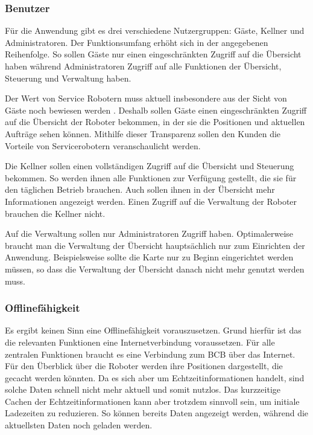 \subsubsection{Benutzer}

Für die Anwendung gibt es drei verschiedene Nutzergruppen: Gäste, Kellner und Administratoren. Der Funktionsumfang erhöht sich in der angegebenen Reihenfolge. So sollen Gäste nur einen eingeschränkten Zugriff auf die Übersicht haben während Administratoren Zugriff auf alle Funktionen der Übersicht, Steuerung und Verwaltung haben.

Der Wert von Service Robotern muss aktuell insbesondere aus der Sicht von Gäste noch bewiesen werden \cite[S.~429]{Paluch2020}. Deshalb sollen Gäste einen eingeschränkten Zugriff auf die Übersicht der Roboter bekommen, in der sie die Positionen und aktuellen Aufträge sehen können. Mithilfe dieser Transparenz sollen den Kunden die Vorteile von Servicerobotern veranschaulicht werden.

Die Kellner sollen einen vollständigen Zugriff auf die Übersicht und Steuerung bekommen. So werden ihnen alle Funktionen zur Verfügung gestellt, die sie für den täglichen Betrieb brauchen. Auch sollen ihnen in der Übersicht mehr Informationen angezeigt werden. Einen Zugriff auf die Verwaltung der Roboter brauchen die Kellner nicht.

Auf die Verwaltung sollen nur Administratoren Zugriff haben. Optimalerweise braucht man die Verwaltung der Übersicht hauptsächlich nur zum Einrichten der Anwendung. Beispielsweise sollte die Karte nur zu Beginn eingerichtet werden müssen, so dass die Verwaltung der Übersicht danach nicht mehr genutzt werden muss.

\subsubsection{Offlinefähigkeit}

Es ergibt keinen Sinn eine Offlinefähigkeit vorauszusetzen. Grund hierfür ist das die relevanten Funktionen eine Internetverbindung voraussetzen. Für alle zentralen Funktionen braucht es eine Verbindung zum \ac{BCB} über das Internet. Für den Überblick über die Roboter werden ihre Positionen dargestellt, die gecacht werden könnten. Da es sich aber um Echtzeitinformationen handelt, sind solche Daten schnell nicht mehr aktuell und somit nutzlos. Das kurzzeitige Cachen der Echtzeitinformationen kann aber trotzdem sinnvoll sein, um initiale Ladezeiten zu reduzieren. So können bereits Daten angezeigt werden, während die aktuellsten Daten noch geladen werden.

